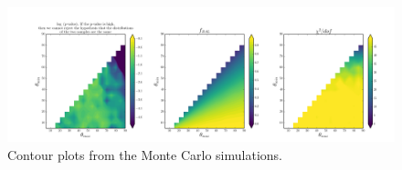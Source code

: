 



\begin{figure} %
\centering
\includegraphics[height=1.0\textwidth, angle=90,origin=c]{figures/ewpaper/contour_ew_o3.png}
\caption
{
Contour plots from the Monte Carlo simulations.
}
\label{fig:contour}
\end{figure} %

